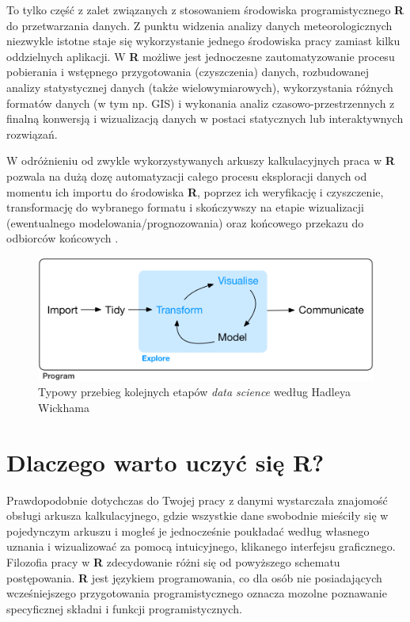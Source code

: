 \documentclass[]{book}
\theoremstyle{definition}
\theoremstyle{definition}
\theoremstyle{definition}
\theoremstyle{remark}
\begin{document}
To tylko część z zalet związanych z stosowaniem środowiska
programistycznego \textbf{R} do przetwarzania danych. Z punktu widzenia
analizy danych meteorologicznych niezwykle istotne staje się
wykorzystanie jednego środowiska pracy zamiast kilku oddzielnych
aplikacji. W \textbf{R} możliwe jest jednoczesne zautomatyzowanie
procesu pobierania i wstępnego przygotowania (czyszczenia) danych,
rozbudowanej analizy statystycznej danych (także wielowymiarowych),
wykorzystania różnych formatów danych (w tym np. GIS) i wykonania analiz
czasowo-przestrzennych z finalną konwersją i wizualizacją danych w
postaci statycznych lub interaktywnych rozwiązań.

W odróżnieniu od zwykle wykorzystywanych arkuszy kalkulacyjnych praca w
\textbf{R} pozwala na dużą dozę automatyzacji całego procesu eksploracji
danych od momentu ich importu do środowiska \textbf{R}, poprzez ich
weryfikację i czyszczenie, transformację do wybranego formatu i
skończywszy na etapie wizualizacji (ewentualnego
modelowania/prognozowania) oraz końcowego przekazu do odbiorców
końcowych \citep{wickham2016}.

\begin{figure}
\centering
\includegraphics{figures/data-science-explore.png}
\caption{Typowy przebieg kolejnych etapów \emph{data science} według
Hadleya Wickhama \citep{wickham2016}}
\end{figure}

\section{\texorpdfstring{Dlaczego warto uczyć się
\textbf{R}?}{Dlaczego warto uczyć się R?}}\label{dlaczego-warto-uczyc-sie-r}

Prawdopodobnie dotychczas do Twojej pracy z danymi wystarczała znajomość
obsługi arkusza kalkulacyjnego, gdzie wszystkie dane swobodnie mieściły
się w pojedynczym arkuszu i mogłeś je jednocześnie poukładać według
własnego uznania i wizualizować za pomocą intuicyjnego, klikanego
interfejsu graficznego. Filozofia pracy w \textbf{R} zdecydowanie różni
się od powyższego schematu postępowania. \textbf{R} jest językiem
programowania, co dla osób nie posiadających wcześniejszego
przygotowania programistycznego oznacza mozolne poznawanie specyficznej
składni i funkcji programistycznych.
\end{document}
